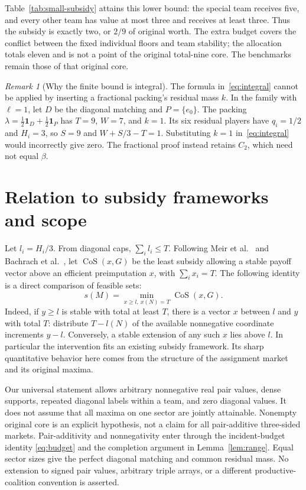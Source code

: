 \documentclass[11pt]{article}
\theoremstyle{remark}
\newtheorem{remark}[theorem]{Remark}
\newcommand{\one}{\mathbf 1}
\begin{document}
Table~\ref{tab:small-subsidy} attains this lower bound: the special team
receives five, and every other team has value at most three and receives
at least three. Thus the subsidy is exactly two, or $2/9$ of original
worth. The extra budget covers the conflict between the fixed individual
floors and team stability; the allocation totals eleven and is not a point
of the original total-nine core. The benchmarks remain those of that
original core.

\begin{remark}[Why the finite bound is integral]\label{rem:fractional}
The formula in~\eqref{eq:integral} cannot be applied by inserting a
fractional packing's residual mass $k$. In the family with $\ell=1$,
let $D$ be the diagonal matching and $P=\{e_0\}$. The packing
$\lambda=\tfrac12\one_D+\tfrac12\one_P$ has $T=9$, $W=7$, and
$k=1$. Its six residual players have $q_i=1/2$ and $H_i=3$, so $S=9$
and $W+S/3-T=1$. Substituting $k=1$ in~\eqref{eq:integral} would
incorrectly give zero. The fractional proof instead retains $C_2$,
which need not equal $\beta$.
\end{remark}

\section{Relation to subsidy frameworks and scope}\label{sec:framework}
Let $l_i=H_i/3$. From diagonal caps, $\sum_i l_i\le T$.
Following Meir et al.~\citep[Section~2.2]{Meir2011} and
Bachrach et al.~\citep[Section~5]{Bachrach2018}, let
$\operatorname{CoS}(x,G)$ be the least subsidy allowing a stable payoff
vector above an efficient preimputation $x$, with $\sum_ix_i=T$.
The following identity is a direct comparison of feasible sets:
\begin{equation}\label{eq:cos}
       s(M)=\min_{x\ge l,\ x(N)=T}\operatorname{CoS}(x,G).
\end{equation}
Indeed, if $y\ge l$ is stable with total at least $T$, there is a vector
$x$ between $l$ and $y$ with total $T$: distribute $T-l(N)$ of the
available nonnegative coordinate increments $y-l$. Conversely, a stable
extension of any such $x$ lies above $l$. In particular the intervention
fits an existing subsidy framework. Its sharp quantitative behavior here
comes from the structure of the assignment market and its original maxima.

Our universal statement allows arbitrary nonnegative real pair values,
dense supports, repeated diagonal labels within a team, and zero diagonal
values. It does not assume that all maxima on one sector are jointly
attainable. Nonempty original core is an explicit hypothesis, not a
claim for all pair-additive three-sided markets. Pair-additivity and
nonnegativity enter through the incident-budget identity
\eqref{eq:budget} and the completion argument in Lemma~\ref{lem:range}.
Equal sector sizes give the perfect diagonal matching and common residual
mass. No extension to signed pair values, arbitrary triple arrays, or a
different productive-coalition convention is asserted.
\end{document}
